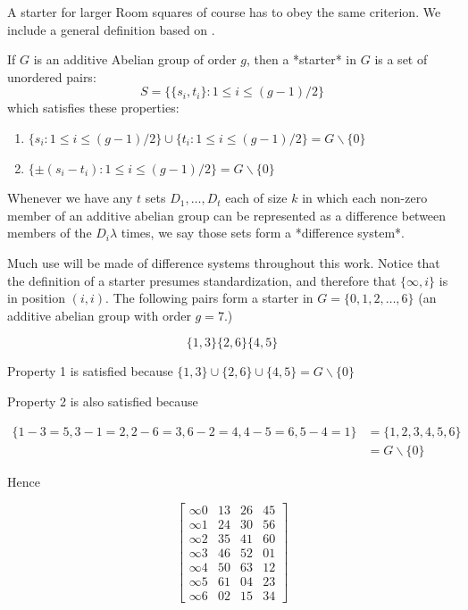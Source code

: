 \documentclass[11pt, a4paper]{book}\usepackage[]{graphicx}\usepackage[]{xcolor}
\begin{document}
A starter for larger Room squares of course has to obey the same
criterion. We include a general definition based on
\cite{dinitzContemporaryDesignTheory1992}.

If $G$ is an additive Abelian group of order $g$, then a
*starter* in $G$ is a set of unordered pairs:
$$S = \{\{s_i, t_i\}:1 \leq i \leq (g - 1)/2\}$$
which satisfies these properties:

\begin{enumerate}
  \item{$\{s_i:1 \leq i \leq (g-1)/2\} \cup \{t_i : 1 \leq i \leq (g-1)/2\} = G \backslash \{0\}$}
  \item{$\{\pm (s_i - t_i ) : 1 \leq i \leq (g-1)/2 \} = G \backslash \{0\}$}
\end{enumerate}

Whenever we have any $t$ sets $D_1, \ldots, D_t$ each of
size $k$ in which each non-zero member of an additive
abelian group can be represented as a difference between
members of the $D_i \lambda$ times, we say those sets form a
*difference system*.

Much use will be made of difference systems throughout this
work. Notice that the definition of a starter presumes
standardization, and therefore that $\{\infty, i\}$ is in
position $(i, i)$. The following pairs form a starter in
$G = \{0, 1, 2, \ldots, 6\}$ (an additive abelian group with
order $g = 7$.)

\begin{equation}
\{1,3\} \{2,6\} \{4,5\}
\end{equation}

Property 1 is satisfied because
$\{1,3\} \cup \{2,6\} \cup \{4,5\} = G \backslash \{0\}$

Property 2 is also satisfied because

\begin{equation}
\begin{split}
\{1 - 3 = 5, 3 - 1 = 2, 2 - 6 = 3, 6 - 2 = 4, 4 - 5 = 6, 5 - 4 = 1\} &= \{1, 2, 3, 4, 5, 6\} \\
 &= G\backslash \{0\}
\end{split}
\end{equation}

Hence

\begin{equation}
  \begin{bmatrix}
    \infty 0 &  13 &  26 &  45 \\
    \infty 1 &  24 &  30 &  56 \\
    \infty 2 &  35 &  41 &  60 \\
    \infty 3 &  46 &  52 &  01 \\
    \infty 4 &  50 &  63 &  12 \\
    \infty 5 &  61 &  04 &  23 \\
    \infty 6 &  02 &  15 &  34
  \end{bmatrix}
  \label{eq:starter}
\end{equation}
\end{document}
